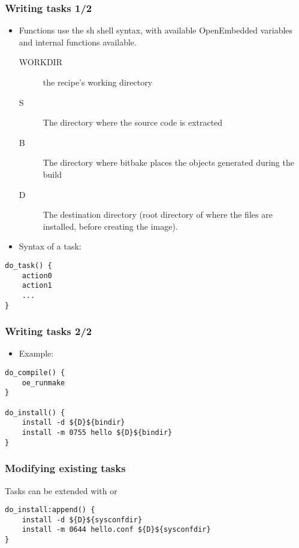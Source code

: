 \begin{frame}[fragile]
  \frametitle{Writing tasks 1/2}
  \begin{itemize}
    \item Functions use the sh shell syntax, with available
      OpenEmbedded variables and internal functions available.
      \begin{description}
        \item[WORKDIR] the recipe's working directory
        \item[S] The directory where the source code is extracted
        \item[B] The directory where bitbake places the objects
          generated during the build
        \item[D] The destination directory (root directory of where
          the files are installed, before creating the image).
      \end{description}
    \item Syntax of a task:
  \end{itemize}
  \begin{block}{}
    \begin{verbatim}
do_task() {
    action0
    action1
    ...
}
    \end{verbatim}
  \end{block}
\end{frame}

\begin{frame}[fragile]
  \frametitle{Writing tasks 2/2}
  \begin{itemize}
    \item Example:
  \end{itemize}
  \begin{block}{}
    \begin{verbatim}
do_compile() {
    oe_runmake
}

do_install() {
    install -d ${D}${bindir}
    install -m 0755 hello ${D}${bindir}
}
    \end{verbatim}
  \end{block}
\end{frame}

\begin{frame}[fragile]
  \frametitle{Modifying existing tasks}
  Tasks can be extended with  or 
  \begin{block}{}
    \begin{verbatim}
do_install:append() {
    install -d ${D}${sysconfdir}
    install -m 0644 hello.conf ${D}${sysconfdir}
}
    \end{verbatim}
  \end{block}
\end{frame}

